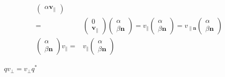 \documentclass[
]{book}
\theoremstyle{definition}
\theoremstyle{definition}
\theoremstyle{definition}
\theoremstyle{definition}
\theoremstyle{remark}
\begin{document}
\[\begin{aligned}
\begin{pmatrix}
\alpha\boldsymbol{v}_{{\scriptscriptstyle \parallel}}
\end{pmatrix}\\
= & \begin{pmatrix}0\\
\boldsymbol{v}_{{\scriptscriptstyle \parallel}}
\end{pmatrix}\begin{pmatrix}\alpha\\
\beta\boldsymbol{n}
\end{pmatrix}=v_{{\scriptscriptstyle \parallel}}\begin{pmatrix}\alpha\\
\beta\boldsymbol{n}
\end{pmatrix}=v_{{\scriptscriptstyle \parallel\boldsymbol{n}}}\begin{pmatrix}\alpha\\
\beta\boldsymbol{n}
\end{pmatrix}\\
\begin{pmatrix}\alpha\\
\beta\boldsymbol{n}
\end{pmatrix}v_{{\scriptscriptstyle \parallel}}= & v_{{\scriptscriptstyle \parallel}}\begin{pmatrix}\alpha\\
\beta\boldsymbol{n}
\end{pmatrix}
\end{aligned}
\]

\(qv_{{\scriptscriptstyle \perp}}=v_{{\scriptscriptstyle \perp}}q^{*}\)
\end{document}
